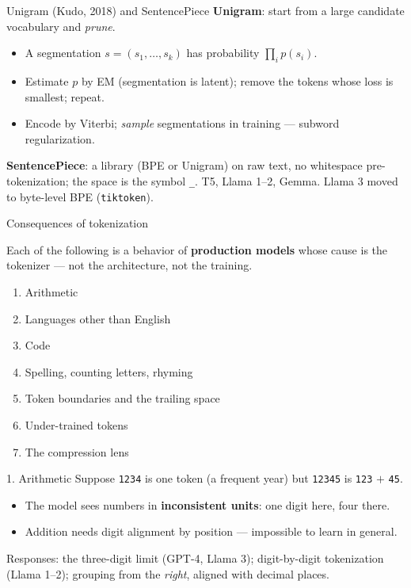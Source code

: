 \documentclass[11pt,aspectratio=169]{beamer}
\newcommand{\dest}[1]{\textcolor{structure}{\textbf{#1}}}
\begin{document}
\begin{frame}{Unigram (Kudo, 2018) and SentencePiece}
  \dest{Unigram}: start from a large candidate vocabulary and \emph{prune}.
  \begin{itemize}
    \item A segmentation $s = (s_1,\dots,s_k)$ has probability $\prod_i p(s_i)$.
    \item Estimate $p$ by EM (segmentation is latent); remove the tokens whose loss is
          smallest; repeat.
    \item Encode by Viterbi; \emph{sample} segmentations in training --- subword
          regularization.
  \end{itemize}

  \vspace{0.8em}
  \dest{SentencePiece}: a library (BPE or Unigram) on raw text, no whitespace
  pre-tokenization; the space is the symbol \texttt{\_}. T5, Llama 1--2, Gemma.
  Llama 3 moved to byte-level BPE (\texttt{tiktoken}).
\end{frame}

\begin{frame}{Consequences of tokenization}
  \begin{block}{}
    Each of the following is a behavior of \textbf{production models} whose cause is the
    tokenizer --- not the architecture, not the training.
  \end{block}

  \vspace{1em}
  \begin{enumerate}
    \item Arithmetic
    \item Languages other than English
    \item Code
    \item Spelling, counting letters, rhyming
    \item Token boundaries and the trailing space
    \item Under-trained tokens
    \item The compression lens
  \end{enumerate}
\end{frame}

\begin{frame}{1. Arithmetic}
  Suppose \texttt{1234} is one token (a frequent year) but \texttt{12345} is
  \texttt{123} $+$ \texttt{45}.

  \vspace{0.8em}
  \begin{itemize}
    \item The model sees numbers in \dest{inconsistent units}: one digit here, four there.
    \item Addition needs digit alignment by position --- impossible to learn in general.
  \end{itemize}

  \vspace{0.8em}
  Responses: the three-digit limit (GPT-4, Llama 3); digit-by-digit tokenization
  (Llama 1--2); grouping from the \emph{right}, aligned with decimal places.
\end{frame}
\end{document}
